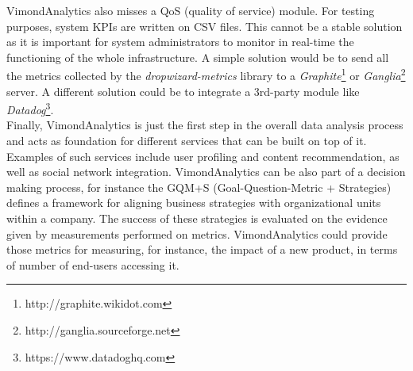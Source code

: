 VimondAnalytics also misses a QoS (quality of service) module. For testing purposes, system KPIs are written on CSV files. This cannot be a stable solution as it is important for system administrators to monitor in real-time the functioning of the whole infrastructure. A simple solution would be to send all the metrics collected by the \textit{dropwizard-metrics} library to a \textit{Graphite}\footnote{http://graphite.wikidot.com} or \textit{Ganglia}\footnote{http://ganglia.sourceforge.net} server. A different solution could be to integrate a 3rd-party module like \textit{Datadog}\footnote{https://www.datadoghq.com}.\\
Finally, VimondAnalytics is just the first step in the overall data analysis process and acts as foundation for different services that can be built on top of it. Examples of such services include user profiling and content recommendation, as well as social network integration. VimondAnalytics can be also part of a decision making process, for instance the GQM+S (Goal-Question-Metric + Strategies) \cite{bib28} defines a framework for aligning business strategies with organizational units within a company. The success of these strategies is evaluated on the evidence given by measurements performed on metrics. VimondAnalytics could provide those metrics for measuring, for instance, the impact of a new product, in terms of number of end-users accessing it.